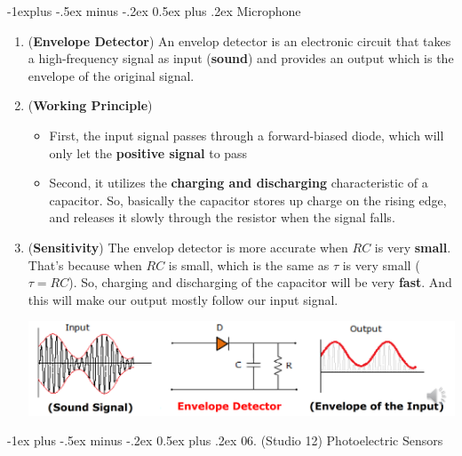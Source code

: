 \documentclass[10pt, landscape]{article}
\makeatletter
\renewcommand{\section}{\@startsection{section}{1}{0mm}%
                                {-1ex plus -.5ex minus -.2ex}%
                                {0.5ex plus .2ex}%
                                {\normalfont\large\bfseries}}
\renewcommand{\subsection}{\@startsection{subsection}{2}{0mm}%
                                {-1explus -.5ex minus -.2ex}%
                                {0.5ex plus .2ex}%
                                {\normalfont\normalsize\bfseries}}
\makeatother
\begin{document}
\begin{multicols}{4}
\subsection{Microphone}
\begin{enumerate}
    \item (\textbf{Envelope Detector}) An envelop detector is an electronic circuit that takes a high-frequency signal as input (\textbf{sound}) and provides an output which is the envelope of the original signal.
    \item (\textbf{Working Principle})
    \begin{itemize}
        \item First, the input signal passes through a forward-biased diode, which will only let the \textbf{positive signal} to pass
        \item Second, it utilizes the \textbf{charging and discharging} characteristic of a capacitor. So, basically the capacitor stores up charge on the rising edge, and releases it slowly through the resistor when the signal falls.
    \end{itemize}
    \item (\textbf{Sensitivity}) The envelop detector is more accurate when $RC$ is very \textbf{small}. That's because when $RC$ is small, which is the same as $\tau$ is very small ($\tau = RC$). So, charging and discharging of the capacitor will be very \textbf{fast}. And this will make our output mostly follow our input signal. \\
    \centerline{\includegraphics[width=1.0\linewidth]{images/envelop-detector.png}}
\end{enumerate}

\section{06. (Studio 12) Photoelectric Sensors}

\end{multicols}
\end{document}
